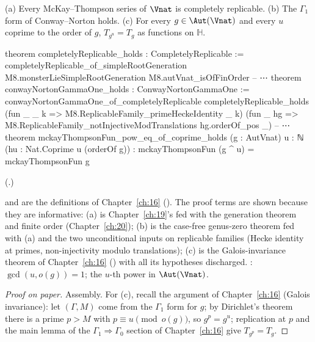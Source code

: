 \begin{theorem}\label{ch22:thm:galois}
(a) Every McKay--Thompson series of $\Vnat$ is completely replicable.  (b) The $\Gamma_1$ form of Conway--Norton holds.
(c) For every $g\in\Aut(\Vnat)$ and every $u$ coprime to the order of $g$, $T_{g^u}=T_g$ as functions on $\mathbb H$.
\end{theorem}
\begin{leancode}
theorem completelyReplicable_holds : CompletelyReplicable :=
  completelyReplicable_of_simpleRootGeneration M8.monsterLieSimpleRootGeneration
    M8.autVnat_isOfFinOrder
-- ⋯
theorem conwayNortonGammaOne_holds : ConwayNortonGammaOne :=
  conwayNortonGammaOne_of_completelyReplicable completelyReplicable_holds
    (fun _ _ k => M8.ReplicableFamily_primeHeckeIdentity _ k)
    (fun _ hg => M8.ReplicableFamily_notInjectiveModTranslations hg.orderOf_pos _)
-- ⋯
theorem mckayThompsonFun_pow_eq_of_coprime_holds (g : AutVnat) {u : ℕ}
    (hu : Nat.Coprime u (orderOf g)) : mckayThompsonFun (g ^ u) = mckayThompsonFun g
\end{leancode}
(.)
\begin{dictionary}
 and  are the definitions of Chapter~\ref{ch:16}
().  The proof terms are shown because they are informative: (a) is
Chapter~\ref{ch:19}'s  fed with the generation theorem
 and finite order  (Chapter~\ref{ch:20}); (b) is the
case-free genus-zero theorem fed with (a) and the two unconditional inputs on replicable families (Hecke identity at primes,
non-injectivity modulo translations); (c) is the Galois-invariance theorem of Chapter~\ref{ch:16}
() with all its hypotheses discharged.
: $\gcd(u,o(g))=1$;  the $u$-th power in $\Aut(\Vnat)$.
\end{dictionary}
\begin{proof}[Proof on paper]
Assembly.  For (c), recall the argument of Chapter~\ref{ch:16} (Galois invariance): let $(\Gamma,M)$ come from the
$\Gamma_1$ form for $g$; by Dirichlet's theorem there is a prime $p>M$ with $p\equiv u\pmod{o(g)}$, so $g^p=g^u$; replication
at $p$ and the main lemma of the $\Gamma_1\Rightarrow\Gamma_0$ section of Chapter~\ref{ch:16} give $T_{g^p}=T_g$.
\end{proof}
